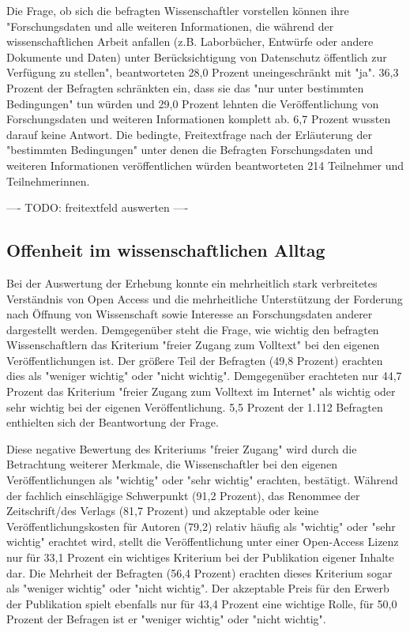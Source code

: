 Die Frage, ob sich die befragten Wissenschaftler vorstellen können ihre "Forschungsdaten und alle weiteren Informationen, die während der wissenschaftlichen Arbeit anfallen (z.B. Laborbücher, Entwürfe oder andere Dokumente und Daten) unter Berücksichtigung von Datenschutz öffentlich zur Verfügung zu stellen", beantworteten 28,0 Prozent uneingeschränkt mit "ja". 36,3 Prozent der Befragten schränkten ein, dass sie das "nur unter bestimmten Bedingungen" tun würden und 29,0 Prozent lehnten die Veröffentlichung von Forschungsdaten und weiteren Informationen komplett ab. 6,7 Prozent wussten darauf keine Antwort. Die bedingte, Freitextfrage nach der Erläuterung der "bestimmten Bedingungen" unter denen die Befragten Forschungsdaten und weiteren Informationen veröffentlichen würden beantworteten 214 Teilnehmer und Teilnehmerinnen.

---- TODO: freitextfeld auswerten ----

\subsection{Offenheit im wissenschaftlichen Alltag}

Bei der Auswertung der Erhebung konnte ein mehrheitlich stark verbreitetes Verständnis von Open Access und die mehrheitliche Unterstützung der Forderung nach Öffnung von Wissenschaft sowie Interesse an Forschungsdaten anderer dargestellt werden. Demgegenüber steht die Frage, wie wichtig den befragten Wissenschaftlern das Kriterium "freier Zugang zum Volltext" bei den eigenen Veröffentlichungen ist. Der größere Teil der Befragten (49,8 Prozent) erachten dies als "weniger wichtig" oder "nicht wichtig". Demgegenüber erachteten nur 44,7 Prozent das Kriterium "freier Zugang zum Volltext im Internet" als wichtig oder sehr wichtig bei der eigenen Veröffentlichung. 5,5 Prozent der 1.112 Befragten enthielten sich der Beantwortung der Frage.

Diese negative Bewertung des Kriteriums "freier Zugang" wird durch die Betrachtung weiterer Merkmale, die Wissenschaftler bei den eigenen Veröffentlichungen als "wichtig" oder "sehr wichtig" erachten, bestätigt. Während der fachlich einschlägige Schwerpunkt (91,2 Prozent), das Renommee der Zeitschrift/des Verlags (81,7 Prozent) und akzeptable oder keine Veröffentlichungskosten für Autoren (79,2) relativ häufig als "wichtig" oder "sehr wichtig" erachtet wird, stellt die Veröffentlichung unter einer Open-Access Lizenz nur für 33,1 Prozent ein wichtiges Kriterium bei der Publikation eigener Inhalte dar. Die Mehrheit der Befragten (56,4 Prozent) erachten dieses Kriterium sogar als "weniger wichtig" oder "nicht wichtig". Der akzeptable Preis für den Erwerb der Publikation spielt ebenfalls nur für 43,4 Prozent eine wichtige Rolle, für 50,0 Prozent der Befragen ist er "weniger wichtig" oder "nicht wichtig".

